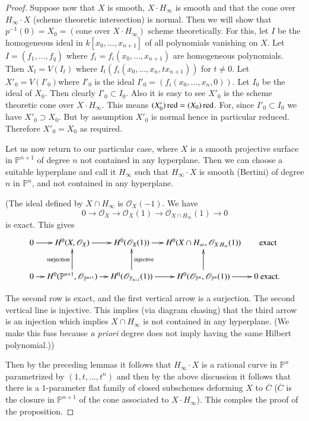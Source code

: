 {\begin{proof}
Suppose now that $X$ is smooth, $X\cdot H_{\infty}$ is smooth and that
the cone over $H_{\infty}\cdot X$ (scheme theoretic intersection) is
normal. Then we will show that $p^{-1}(0)=X_{0}=(\text{cone over~}
X\cdot H_{\infty})$ scheme theoretically. For this, let $I$ be the
homogeneous ideal in $k[x_{0},\ldots,x_{n+1}]$ of all polynomials
vanishing on $X$. Let $I=(f_{1},\ldots,f_{q})$ where
$f_{i}=f_{i}(x_{0},\ldots,x_{n+1})$ are homogeneous polynomials. Then
$X_{t}=V(I_{t})$ where $I_{t}(f_{i}(x_{0},\ldots,x_{n},tx_{n+1}))$ for
$t\neq 0$. Let $X'_{0}=V(I'_{0})$\pageoriginale where $I'_{0}$ is the
ideal $I'_{0}=(f_{i}(x_{0},\ldots,x_{n},0))$. Let $I_{0}$ be the ideal
of $X_{0}$. Then clearly $I'_{0}\subset I_{0}$. Also it is easy to see
$X'_{0}$ is the scheme theoretic cone over $X\cdot H_{\infty}$. This
means $(X'_{0})\operatorname{red}=(X_{0})\operatorname{red}$. For, since $I'_{0}\subset I_{0}$ we
have $X'_{0}\supset X_{0}$. But by assumption $X'_{0}$ is normal hence
in particular reduced. Therefore $X'_{0}=X_{0}$ as required.

Let us now return to our particular case, where $X$ is a smooth
projective surface in $\mathbb{P}^{n+1}$ of degree $n$ not contained
in any hyperplane. Then we can choose a suitable hyperplane and call
it $H_{\infty}$ such that $H_{\infty}\cdot X$ is smooth (Bertini) of
degree $n$ in $\mathbb{P}^{n}$, and not contained in any hyperplane.

(The ideal defined by $X\cap H_{\infty}$ is $\mathscr{O}_{X}(-1)$. We
have 
$$
0\to \mathscr{O}_{X}\to \mathscr{O}_{X}(1)\to \mathscr{O}_{X\cap
  H_{\infty}}(1)\to 0
$$
is exact. This gives
{\fontsize{10pt}{12pt}\selectfont
\[
\xymatrix@C=.35cm{
0\ar[r] & H^{0}(X,\mathscr{O}_{X})\ar[r] &
H^{0}(\mathscr{O}_{X}(1))\ar[r] & H^{0}(X\cap
H_{\infty},\mathscr{O}_{X\cdot H_{\infty}}(1)) & \text{~ exact}\\
0\ar[r] &
H^{0}(\mathbb{P}^{n+1},\mathscr{O}_{\mathbb{P}^{n+1}})\ar[u]^{\text{surjection}}
\ar[r] &
H^{0}(\mathscr{O}_{\mathbb{P}_{n+1}}(1))\ar[u]_{\text{injective}}\ar[r]
&
H^{0}(\mathscr{O}_{\mathbb{P}^{n}},\mathscr{O}_{\mathbb{P}^{n}}(1))\ar[r]\ar[u]
& 0\text{~exact.}
}
\]}\relax

The second row is exact, and the first vertical arrow is a
surjection. The second vertical line is injective. This implies (via
diagram chasing) that the third arrow is an injection which implies
$X\cap H_{\infty}$ is not contained in any hyperplane. (We make this
fuss because {\em a priori} degree does not imply having the same
Hilbert polynomial.))

Then by the preceding lemmas it follows that $H_{\infty}\cdot X$ is a
rational curve in $\mathbb{P}^{n}$ parametrized by
$(1,t,\ldots,t^{n})$ and then by the above discussion it\pageoriginale
follows that there is a $1$-parameter flat family of closed subschemes
deforming $X$ to $\overline{C}$ ($\overline{C}$ is the closure in
$\mathbb{P}^{n+1}$ of the cone associated to $X\cdot
H_{\infty}$). This comples the proof of the proposition.
\end{proof}

}
